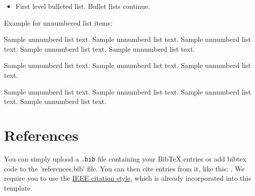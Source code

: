 \documentclass[10pt,a4paper]{article}
\newenvironment{unlist}{%
  \begin{list}{}{%
    \setlength{\labelwidth}{0pt}%
    \setlength{\labelsep}{0pt}%
    \setlength{\leftmargin}{2em}%
    \setlength{\itemindent}{-2em}%
    \setlength{\topsep}{\medskipamount}%
    \setlength{\itemsep}{3pt}%
  }%
}{%
  \end{list}%
}
\begin{document}
\begin{appendices}
\begin{itemize}
\item First level bulleted list. Bullet lists continue.
\end{itemize}

\noindent
Example for unnumbered list items:

\begin{unlist}
\item Sample unnumberd list text. Sample unnumberd list text. Sample unnumberd list text. Sample unnumberd list text. Sample unnumberd list text.

\item Sample unnumberd list text. Sample unnumberd list text. Sample unnumberd list text.

\item Sample unnumberd list text. Sample unnumberd list text. Sample unnumberd list text. Sample unnumberd list text. 
\end{unlist}


\section{References}

You can simply upload a \verb|.bib| file containing your BibTeX entries or add bibtex code to the 'references.bib' file. You can then cite entries from it, like this: \cite{navarro2013learning}. We require you to use the \href{https://www.bath.ac.uk/publications/library-guides-to-citing-referencing/attachments/ieee-style-guide.pdf}{IEEE citation style}, which is already incorporated into this template. 


\end{appendices}
\end{document}
